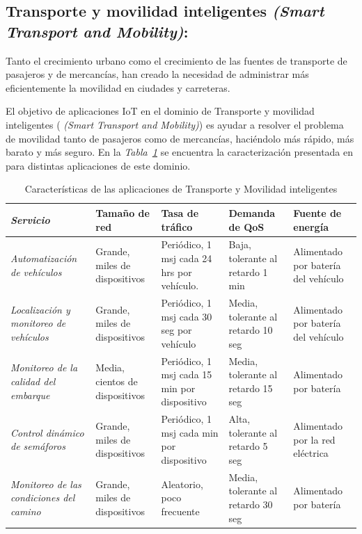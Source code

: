 \subsection{Transporte y movilidad inteligentes \textit{(Smart Transport and Mobility)}:}

Tanto el crecimiento urbano como el crecimiento de las fuentes de transporte de pasajeros y de mercancías, han creado la necesidad de administrar más eficientemente la movilidad en ciudades y carreteras. \newline

El objetivo de aplicaciones IoT en el dominio de Transporte y movilidad inteligentes (\textit{ (Smart Transport and Mobility)}) es ayudar a resolver el problema de movilidad tanto de pasajeros como de mercancías, haciéndolo más rápido, más barato y más seguro. En la \textit{Tabla~\ref{tab:smartrans}} se encuentra la caracterización presentada en \parencite{NetTrafficIoT} para distintas aplicaciones de este dominio.

\begin{table}
\caption{Características de las aplicaciones de Transporte y Movilidad inteligentes}
\label{tab:smartrans}
\centering
\begin{tabular}{*{5}{m{3cm}}}\\ 
\textit{Servicio} & Tamaño de red & Tasa de tráfico & Demanda de QoS & Fuente de energía \\ \hline \hline
\textit{Automatización de vehículos}  & \footnotesize{ Grande, miles de dispositivos } & \footnotesize{ Periódico, 1 msj cada 24 hrs por vehículo. } & \footnotesize{ Baja, tolerante al retardo 1 min } & \footnotesize{ Alimentado por batería del vehículo } \\ \hline 
\textit{Localización y monitoreo de vehículos}  & \footnotesize{ Grande, miles de dispositivos } & \footnotesize{ Periódico, 1 msj cada 30 seg por vehículo } & \footnotesize{ Media, tolerante al retardo 10 seg } & \footnotesize{ Alimentado por batería del vehículo } \\ \hline 
\textit{Monitoreo de la calidad del embarque}  & \footnotesize{ Media, cientos de dispositivos } & \footnotesize{ Periódico, 1 msj cada 15 min por dispositivo } & \footnotesize{ Media, tolerante al retardo 15 seg } & \footnotesize{ Alimentado por batería } \\ \hline 
\textit{Control dinámico de semáforos}  & \footnotesize{ Grande, miles de dispositivos } & \footnotesize{ Periódico, 1 msj cada min por dispositivo } & \footnotesize{ Alta, tolerante al retardo 5 seg } & \footnotesize{ Alimentado por la red eléctrica } \\ \hline 
\textit{Monitoreo de las condiciones del camino} & \footnotesize{ Grande, miles de dispositivos } & \footnotesize{ Aleatorio, poco frecuente } & \footnotesize{ Media, tolerante al retardo 30 seg } & \footnotesize{ Alimentado por batería } \\
\end{tabular}
\end{table}


